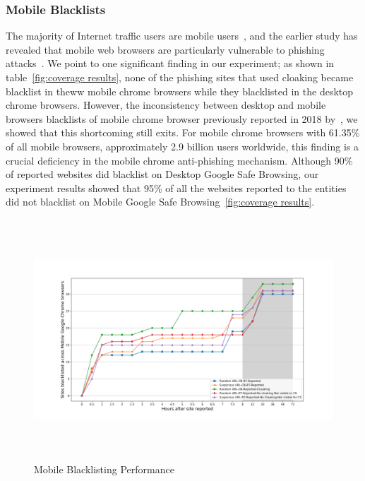 \subsubsection{Mobile Blacklists}
The majority of Internet traffic users are mobile users~\cite{statcounterglobalstats}, and the earlier study has revealed that mobile web browsers are particularly vulnerable to phishing attacks~\cite{luo2017hindsight}.
We point to one significant finding in our experiment; as shown in table~\ref{fig:coverage results}, none of the phishing sites that used cloaking became blacklist in theww  mobile chrome browsers while they blacklisted in the desktop chrome browsers. However, the inconsistency between desktop and mobile browsers blacklists of mobile chrome browser previously reported in 2018 by~\cite{oest2019phishfarm}, we showed that this shortcoming still exits.
For mobile chrome browsers with 61.35\%  of all mobile browsers, approximately 2.9 billion users worldwide, this finding is a crucial deficiency in the mobile chrome anti-phishing mechanism.
Although 90\%  of reported websites did blacklist on Desktop Google Safe Browsing, our experiment results showed that 95\%  of all the websites reported to the entities did not blacklist on Mobile Google Safe Browsing~\ref{fig:coverage results}.

\begin{figure}[t]
  \includegraphics[width=\textwidth,height=9cm]{figures/Mobile-Blacklists-Speed.png}
  \caption{Mobile Blacklisting Performance }
  \label{Blacklisting speed results}
\end{figure}


